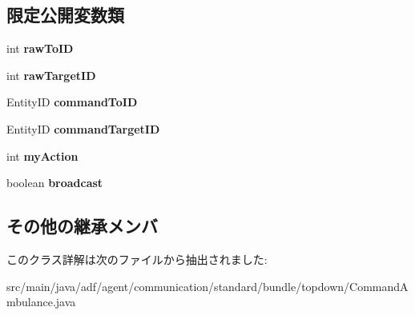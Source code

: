\subsection*{限定公開変数類}
\begin{DoxyCompactItemize}
\item 
\hypertarget{classadf_1_1agent_1_1communication_1_1standard_1_1bundle_1_1topdown_1_1CommandAmbulance_a31051c1bc32dc12fac65690d9281a1a1}{}\label{classadf_1_1agent_1_1communication_1_1standard_1_1bundle_1_1topdown_1_1CommandAmbulance_a31051c1bc32dc12fac65690d9281a1a1} 
int {\bfseries raw\+To\+ID}
\item 
\hypertarget{classadf_1_1agent_1_1communication_1_1standard_1_1bundle_1_1topdown_1_1CommandAmbulance_ad888a0ed00e9c5cb8a3fbd3b068c8840}{}\label{classadf_1_1agent_1_1communication_1_1standard_1_1bundle_1_1topdown_1_1CommandAmbulance_ad888a0ed00e9c5cb8a3fbd3b068c8840} 
int {\bfseries raw\+Target\+ID}
\item 
\hypertarget{classadf_1_1agent_1_1communication_1_1standard_1_1bundle_1_1topdown_1_1CommandAmbulance_ab1b500c2c036d3f0757960b66a45d347}{}\label{classadf_1_1agent_1_1communication_1_1standard_1_1bundle_1_1topdown_1_1CommandAmbulance_ab1b500c2c036d3f0757960b66a45d347} 
Entity\+ID {\bfseries command\+To\+ID}
\item 
\hypertarget{classadf_1_1agent_1_1communication_1_1standard_1_1bundle_1_1topdown_1_1CommandAmbulance_a7c32b44d41dfcc324f2b96d1003f2561}{}\label{classadf_1_1agent_1_1communication_1_1standard_1_1bundle_1_1topdown_1_1CommandAmbulance_a7c32b44d41dfcc324f2b96d1003f2561} 
Entity\+ID {\bfseries command\+Target\+ID}
\item 
\hypertarget{classadf_1_1agent_1_1communication_1_1standard_1_1bundle_1_1topdown_1_1CommandAmbulance_a833fb26d29b54d06a1161084d3745e26}{}\label{classadf_1_1agent_1_1communication_1_1standard_1_1bundle_1_1topdown_1_1CommandAmbulance_a833fb26d29b54d06a1161084d3745e26} 
int {\bfseries my\+Action}
\item 
\hypertarget{classadf_1_1agent_1_1communication_1_1standard_1_1bundle_1_1topdown_1_1CommandAmbulance_a29b002c5973669bce42d262debc97cb2}{}\label{classadf_1_1agent_1_1communication_1_1standard_1_1bundle_1_1topdown_1_1CommandAmbulance_a29b002c5973669bce42d262debc97cb2} 
boolean {\bfseries broadcast}
\end{DoxyCompactItemize}
\subsection*{その他の継承メンバ}


このクラス詳解は次のファイルから抽出されました\+:\begin{DoxyCompactItemize}
\item 
src/main/java/adf/agent/communication/standard/bundle/topdown/Command\+Ambulance.\+java\end{DoxyCompactItemize}
